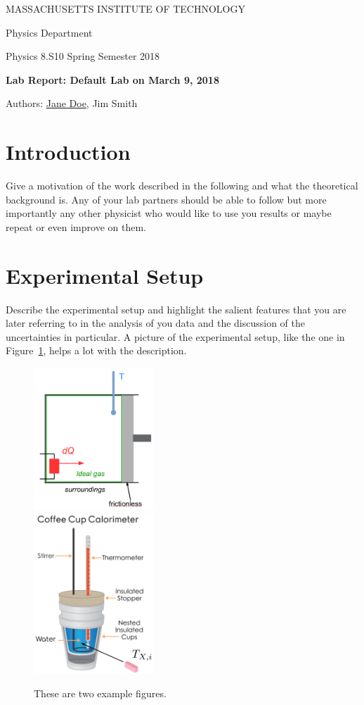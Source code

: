 \documentclass[12pt]{article}
\begin{document}
\centerline{MASSACHUSETTS INSTITUTE OF TECHNOLOGY}
\centerline{Physics Department}
\noindent Physics 8.S10 \hfil Spring Semester 2018\break


\centerline{\bf Lab Report: Default Lab on March 9, 2018} %
\centerline{Authors: \underline{Jane Doe}, Jim Smith}     %

\section{Introduction}

Give a motivation of the work described in the following and what the
theoretical background is. Any of your lab partners should be able to follow but
more importantly any other physicist who would like to use you results or maybe
repeat or even improve on them.

\section{Experimental Setup}

Describe the experimental setup and highlight the salient features that you are
later referring to in the analysis of you data and the discussion of the
uncertainties in particular. A picture of the experimental setup, like the one
in Figure~\ref{fig:myPngExample}, helps a lot with the description.

\begin{figure}[htbp!]
  \centering
  \includegraphics[width=0.4\textwidth]{myPngExample1.png}~~~~~~~~~~~~~
  \includegraphics[width=0.4\textwidth]{myPngExample2.png}
  \caption{\label{fig:myPngExample}
    These are two example figures.
  }
\end{figure}
\end{document}
